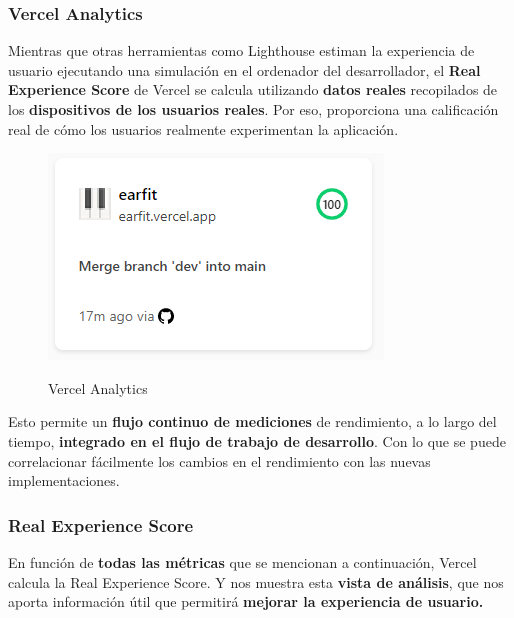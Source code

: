 \documentclass[12pt,twoside,titlepage]{report}
\begin{document}
{\subsubsection{Vercel Analytics}

Mientras que otras herramientas como Lighthouse estiman la experiencia de usuario ejecutando una simulación en el ordenador del desarrollador, el \textbf{Real Experience Score} de Vercel se calcula utilizando \textbf{datos reales} recopilados de los \textbf{dispositivos de los usuarios reales}. Por eso, proporciona una calificación real de cómo los usuarios realmente experimentan la aplicación.

\begin{figure}[H]
    \centering
    \includegraphics[scale=0.8]{Vercel/VercelAnalyticsResume}
    \label{fig:Vercel_metrics_resume}
    \caption{Vercel Analytics}
\end{figure}

Esto permite un \textbf{flujo continuo de mediciones} de rendimiento, a lo largo del tiempo, \textbf{integrado en el flujo de trabajo de desarrollo}. Con lo que se puede correlacionar fácilmente los cambios en el rendimiento con las nuevas implementaciones.

\subsubsection{Real Experience Score}

En función de \textbf{todas las métricas} que se mencionan a continuación, Vercel calcula la Real Experience Score. Y nos muestra esta \textbf{vista de análisis}, que nos aporta información útil que permitirá \textbf{mejorar la experiencia de usuario.}

}
\end{document}
